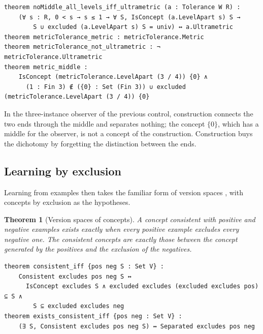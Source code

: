 \documentclass[11pt]{article}
\theoremstyle{plain}
\newtheorem{theorem}{Theorem}[section]
\theoremstyle{definition}
\begin{document}
\begin{lstlisting}
theorem noMiddle_all_levels_iff_ultrametric (a : Tolerance W R) :
    (∀ s : R, 0 < s → s ≤ 1 → ∀ S, IsConcept (a.LevelApart s) S →
        S ∪ excluded (a.LevelApart s) S = univ) ↔ a.Ultrametric
theorem metricTolerance_metric : metricTolerance.Metric
theorem metricTolerance_not_ultrametric : ¬ metricTolerance.Ultrametric
theorem metric_middle :
    IsConcept (metricTolerance.LevelApart (3 / 4)) {0} ∧
      (1 : Fin 3) ∉ ({0} : Set (Fin 3)) ∪ excluded (metricTolerance.LevelApart (3 / 4)) {0}
\end{lstlisting}

\noindent In the three-instance observer of the previous control, construction connects the two
ends through the middle and separates nothing; the concept $\{0\}$, which has a middle for the
observer, is not a concept of the construction. Construction buys the dichotomy by forgetting the
distinction between the ends.

\subsection{Learning by exclusion}

\noindent Learning from examples then takes the familiar form of version spaces
\cite{Mitchell1982}, with concepts by exclusion as the hypotheses.

\begin{theorem}[Version spaces of concepts]
A concept consistent with positive and negative examples exists exactly when every positive
example excludes every negative one. The consistent concepts are exactly those between the
concept generated by the positives and the exclusion of the negatives.
\end{theorem}

\begin{lstlisting}
theorem consistent_iff {pos neg S : Set V} :
    Consistent excludes pos neg S ↔
      IsConcept excludes S ∧ excluded excludes (excluded excludes pos) ⊆ S ∧
        S ⊆ excluded excludes neg
theorem exists_consistent_iff {pos neg : Set V} :
    (∃ S, Consistent excludes pos neg S) ↔ Separated excludes pos neg
\end{lstlisting}
\end{document}
